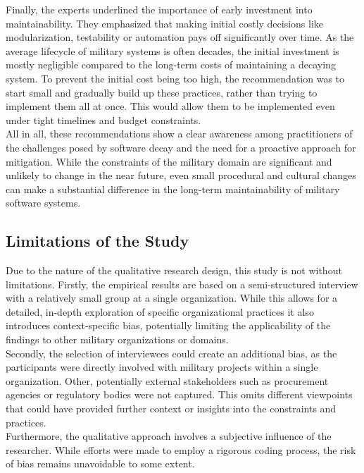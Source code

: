 Finally, the experts underlined the importance of early investment into maintainability. They emphasized that making initial costly decisions like modularization, testability or automation pays off significantly over time.
As the average lifecycle of military systems is often decades, the initial investment is mostly negligible compared to the long-term costs of maintaining a decaying system.
To prevent the initial cost being too high, the recommendation was to start small and gradually build up these practices, rather than trying to implement them all at once. This would allow them to be implemented even under tight timelines and budget constraints.\\

All in all, these recommendations show a clear awareness among practitioners of the challenges posed by software decay and the need for a proactive approach for mitigation. While the constraints of the military domain are significant and unlikely to change in the near future, even small procedural and 
cultural changes can make a substantial difference in the long-term maintainability of military software systems.\\

\subsection{Limitations of the Study}
Due to the nature of the qualitative research design, this study is not without limitations. Firstly, the empirical results are based on a semi-structured interview with a relatively small group at a single organization.
While this allows for a detailed, in-depth exploration of specific organizational practices it also introduces context-specific bias, potentially limiting the applicability of the findings to other military organizations or domains.\\

Secondly, the selection of interviewees could create an additional bias, as the participants were directly involved with military projects within a single organization. Other, potentially external stakeholders such as procurement agencies
or regulatory bodies were not captured. This omits different viewpoints that could have provided further context or insights into the constraints and practices.\\

Furthermore, the qualitative approach involves a subjective influence of the researcher. While efforts were made to employ a rigorous coding process, the risk of bias remains unavoidable to some extent.\\

